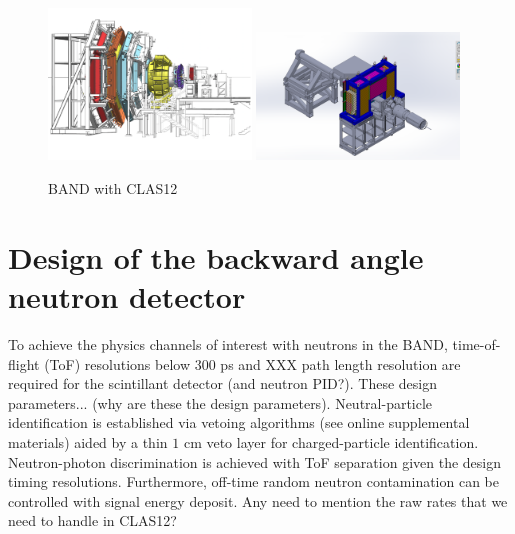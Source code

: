 \documentclass[review]{elsarticle}
\begin{document}
\begin{figure}[h]
	\centering
	\includegraphics[width=0.48\textwidth]{BandInClas.pdf}
	\includegraphics[width=0.48\textwidth]{BandInContext1.png}
		\caption{BAND with CLAS12}
		\label{fig:clas12}
\end{figure}



\section{Design of the backward angle neutron detector}
To achieve the physics channels of interest with neutrons in the BAND, time-of-flight (ToF) resolutions below $300$ \si{\pico\second} and XXX path length 
resolution are required for the scintillant detector {\color{red}(and neutron PID?)}. {\color{red}These design parameters... (why are these the 
design parameters)}. Neutral-particle identification is established via vetoing algorithms ({\color{red}see online supplemental materials}) aided by
a thin $1$ \si{\centi\meter} veto layer for charged-particle identification. Neutron-photon discrimination is achieved with ToF separation given the design 
timing resolutions. Furthermore, off-time random neutron contamination can be controlled with signal energy deposit. {\color{red} Any need to mention 
the raw rates that we need to handle in CLAS12?} 
\end{document}
